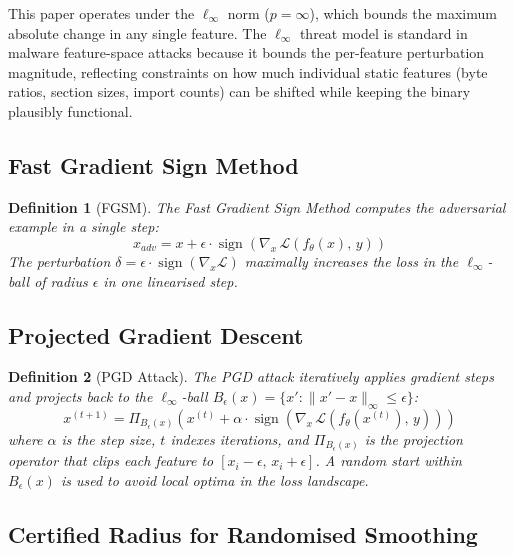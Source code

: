 \documentclass[conference]{IEEEtran}
\newtheorem{definition}{Definition}
\begin{document}
This paper operates under the $\ell_\infty$ norm ($p = \infty$), which bounds the maximum absolute change in any single feature. The $\ell_\infty$ threat model is standard in malware feature-space attacks because it bounds the per-feature perturbation magnitude, reflecting constraints on how much individual static features (byte ratios, section sizes, import counts) can be shifted while keeping the binary plausibly functional.

\subsection{Fast Gradient Sign Method}

\begin{definition}[FGSM]
The Fast Gradient Sign Method \cite{goodfellow2015} computes the adversarial example in a single step:
\begin{equation}
x_{adv} = x + \epsilon \cdot \operatorname{sign}\!\left(\nabla_x\, \mathcal{L}(f_\theta(x),\, y)\right)
\label{eq:fgsm}
\end{equation}
The perturbation $\delta = \epsilon \cdot \operatorname{sign}(\nabla_x \mathcal{L})$ maximally increases the loss in the $\ell_\infty$-ball of radius $\epsilon$ in one linearised step.
\end{definition}

\subsection{Projected Gradient Descent}

\begin{definition}[PGD Attack]
The PGD attack \cite{madry2018} iteratively applies gradient steps and projects back to the $\ell_\infty$-ball $B_\epsilon(x) = \{x' : \|x' - x\|_\infty \leq \epsilon\}$:
\begin{equation}
x^{(t+1)} = \Pi_{B_\epsilon(x)}\!\left(x^{(t)} + \alpha \cdot \operatorname{sign}\!\left(\nabla_x\, \mathcal{L}(f_\theta(x^{(t)}),\, y)\right)\right)
\label{eq:pgd}
\end{equation}
where $\alpha$ is the step size, $t$ indexes iterations, and $\Pi_{B_\epsilon(x)}$ is the projection operator that clips each feature to $[x_i - \epsilon,\, x_i + \epsilon]$. A random start within $B_\epsilon(x)$ is used to avoid local optima in the loss landscape.
\end{definition}

\subsection{Certified Radius for Randomised Smoothing}
\end{document}
